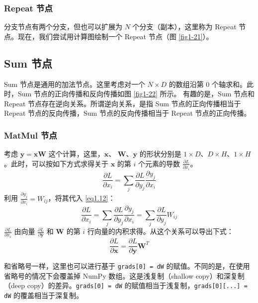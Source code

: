 \subsubsection*{Repeat 节点}
分支节点有两个分支，但也可以扩展为 $N$ 个分支（副本），这里称为 Repeat 节点。现在，我们尝试用计算图绘制一个 Repeat 节点（图 \autoref{fig1-21}）。
\subsection*{Sum 节点}
Sum 节点是通用的加法节点。这里考虑对一个 $N \times D$ 的数组沿第 0 个轴求和。此时，Sum 节点的正向传播和反向传播如图 \autoref{fig1-22} 所示。 有趣的是，Sum 节点和 Repeat 节点存在逆向关系。所谓逆向关系，是指 Sum 节点的正向传播相当于 Repeat 节点的反向传播，Sum 节点的反向传播相当于 Repeat 节点的正向传播。
\subsubsection*{MatMul 节点}
考虑 $\bm{y}=\bm{x}\bm{W}$ 这个计算，这里，$\bm{x}$、
$\bm{W}$、$\bm{y}$ 的形状分别是 $1 \times D$、$D \times H$、$1 \times H$。此时，可以按如下方式求得关于 $\bm{x}$ 的第 $i$ 个元素的导数 $\frac{\partial L}{\partial x_i}$。
\begin{equation}
    \label{eq1.12}
    \frac{\partial L}{\partial x_i}=\sum_{j}\frac{\partial L}{\partial y_j}\frac{\partial y_j}{\partial x_i}
\end{equation}
利用 $\frac{\partial y_j}{\partial x_i}=W_{ij}$，将其代入 \autoref{eq1.12}：
\begin{equation}
    \frac{\partial L}{\partial x_i}=\sum_{j}\frac{\partial L}{\partial y_j}\frac{\partial y_j}{\partial x_i}=\sum_{j}\frac{\partial L}{\partial y_j}W_{ij}
\end{equation}
$\frac{\partial L}{\partial x_i}$ 由向量 $\frac{\partial L}{\partial \bm{y}}$ 和 $\bm{W}$ 的第 $i$ 行向量的内积求得。从这个关系可以导出下式：
\begin{equation}
    \frac{\partial L}{\partial \bm{x}}=\frac{\partial L}{\partial \bm{y}}\bm{W}^T
\end{equation}

和省略号一样，这里也可以进行基于 \verb|grads[0] = dW| 的赋值。不同的是，在使用省略号的情况下会覆盖掉 NumPy 数组。这是浅复制（shallow copy）和深复制（deep copy）的差异。\verb|grads[0] = dW| 的赋值相当于浅复制，\verb|grads[0][...] = dW| 的覆盖相当于深复制。

